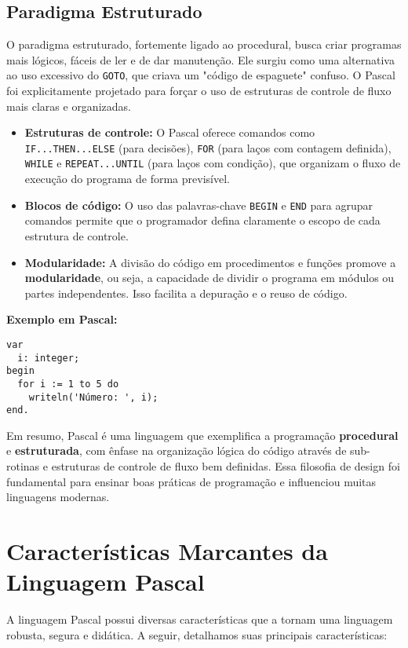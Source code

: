 \documentclass[12pt,a4paper,oneside]{abntex2}
\begin{document}
\section{Paradigma Estruturado}
O paradigma estruturado, fortemente ligado ao procedural, busca criar programas mais lógicos, fáceis de ler e de dar manutenção. Ele surgiu como uma alternativa ao uso excessivo do \texttt{GOTO}, que criava um "código de espaguete" confuso. O Pascal foi explicitamente projetado para forçar o uso de estruturas de controle de fluxo mais claras e organizadas.

\begin{itemize}
    \item \textbf{Estruturas de controle:} O Pascal oferece comandos como \texttt{IF...THEN...ELSE} (para decisões), \texttt{FOR} (para laços com contagem definida), \texttt{WHILE} e \texttt{REPEAT...UNTIL} (para laços com condição), que organizam o fluxo de execução do programa de forma previsível.
    \item \textbf{Blocos de código:} O uso das palavras-chave \texttt{BEGIN} e \texttt{END} para agrupar comandos permite que o programador defina claramente o escopo de cada estrutura de controle.
    \item \textbf{Modularidade:} A divisão do código em procedimentos e funções promove a \textbf{modularidade}, ou seja, a capacidade de dividir o programa em módulos ou partes independentes. Isso facilita a depuração e o reuso de código.
\end{itemize}
\textbf{Exemplo em Pascal:}
\begin{verbatim}
var
  i: integer;
begin
  for i := 1 to 5 do
    writeln('Número: ', i);
end.
\end{verbatim}

Em resumo, Pascal é uma linguagem que exemplifica a programação \textbf{procedural} e \textbf{estruturada}, com ênfase na organização lógica do código através de sub-rotinas e estruturas de controle de fluxo bem definidas. Essa filosofia de design foi fundamental para ensinar boas práticas de programação e influenciou muitas linguagens modernas.

\chapter{Características Marcantes da Linguagem Pascal}
A linguagem Pascal possui diversas características que a tornam uma linguagem robusta, segura e didática. A seguir, detalhamos suas principais características:
\end{document}
